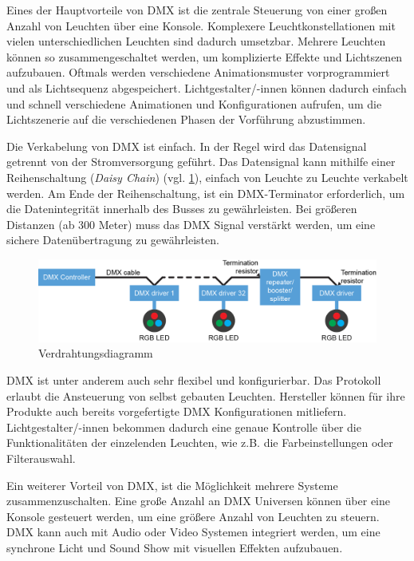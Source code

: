 Eines der Hauptvorteile von DMX ist die zentrale Steuerung von einer großen Anzahl von Leuchten über eine Konsole. Komplexere Leuchtkonstellationen mit vielen unterschiedlichen Leuchten sind dadurch umsetzbar. Mehrere Leuchten können so zusammengeschaltet werden, um komplizierte Effekte und Lichtszenen aufzubauen. Oftmals werden verschiedene Animationsmuster vorprogrammiert und als Lichtsequenz abgespeichert. Lichtgestalter/-innen können dadurch einfach und schnell verschiedene Animationen und Konfigurationen aufrufen, um die Lichtszenerie auf die verschiedenen Phasen der Vorführung abzustimmen.

Die Verkabelung von DMX ist einfach. In der Regel wird das Datensignal getrennt von der Stromversorgung geführt. Das Datensignal kann mithilfe einer Reihenschaltung (\emph{Daisy Chain}) (vgl. \ref{fig:dmx_wiring diagram}), einfach von Leuchte zu Leuchte verkabelt werden. Am Ende der Reihenschaltung, ist ein DMX-Terminator erforderlich, um die Datenintegrität innerhalb des Busses zu gewährleisten. Bei größeren Distanzen (ab 300 Meter) muss das DMX Signal verstärkt werden, um eine sichere Datenübertragung zu gewährleisten.

\begin{figure}[H]
	\centering
	\includegraphics[width=.9\linewidth]{Pictures/dmxWiringDiagram}
	\caption{Verdrahtungsdiagramm \cite[S.64]{DMX_Wiring}}
	\label{fig:dmx_wiring diagram}
\end{figure}

DMX ist unter anderem auch sehr flexibel und konfigurierbar. Das Protokoll erlaubt die Ansteuerung von selbst gebauten Leuchten. Hersteller können für ihre Produkte auch bereits vorgefertigte DMX Konfigurationen mitliefern\cite[S.30]{DMX_Wiring}. Lichtgestalter/-innen bekommen dadurch eine genaue Kontrolle über die Funktionalitäten der einzelenden Leuchten, wie z.B. die Farbeinstellungen oder Filterauswahl.

Ein weiterer Vorteil von DMX, ist die Möglichkeit mehrere Systeme zusammenzuschalten. Eine große Anzahl an DMX Universen können über eine Konsole gesteuert werden, um eine größere Anzahl von Leuchten zu steuern. DMX kann auch mit Audio oder Video Systemen integriert werden, um eine synchrone Licht und Sound Show mit visuellen Effekten aufzubauen.

